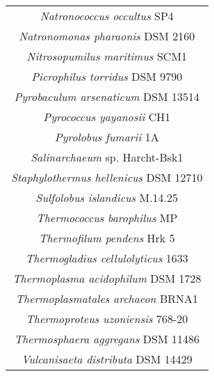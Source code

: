 \begin{longtable}
\begin{tabular}{|c|}
\textit{Natronococcus occultus} SP4\\
\textit{Natronomonas pharaonis} DSM 2160\\
\textit{Nitrosopumilus maritimus} SCM1\\
\textit{Picrophilus torridus} DSM 9790\\
\textit{Pyrobaculum arsenaticum} DSM 13514\\
\textit{Pyrococcus yayanosii} CH1\\
\textit{Pyrolobus fumarii} 1A\\
\textit{Salinarchaeum} sp. Harcht-Bsk1\\
\textit{Staphylothermus hellenicus} DSM 12710\\
\textit{Sulfolobus islandicus} M.14.25\\
\textit{Thermococcus barophilus} MP\\
\textit{Thermofilum pendens} Hrk 5\\
\textit{Thermogladius cellulolyticus} 1633\\
\textit{Thermoplasma acidophilum} DSM 1728\\
\textit{Thermoplasmatales archaeon} BRNA1\\
\textit{Thermoproteus uzoniensis} 768-20\\
\textit{Thermosphaera aggregans} DSM 11486\\
\textit{Vulcanisaeta distributa} DSM 14429\\
\hline
\end{tabular}
\caption[]{}
\label{tab:edicer_archaea}
\end{longtable}



